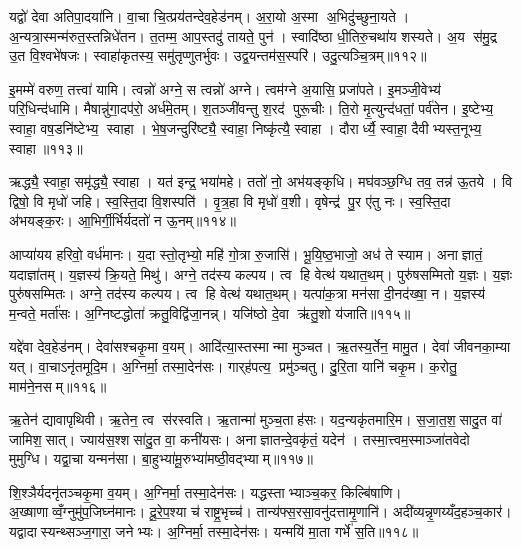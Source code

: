 यद्वो॑ देवा अतिपा॒दया॑नि। वा॒चा चि॒त्प्रय॑तन्देव॒हेड॑नम्। अ॒रा॒यो अ॒स्मा अ॒भिदु॑च्छुना॒यते। अ॒न्यत्रा॒स्मन्म॑रुत॒स्तन्निधे॑तन। त॒तम्म॒ आप॒स्तदु॑ तायते॒ पुन॑। स्वादि॑ष्ठा धी॒तिरु॒चथा॑य शस्यते। अ॒य स॑मु॒द्र उ॒त वि॒श्वभे॑षजः। स्वाहा॑कृतस्य॒ समु॑तृप्णुतर्भुवः। उद्व॒यन्तम॑स॒स्परि॑। उदु॒त्यञ्चि॒त्रम्॥११२॥

इ॒मम्मे॑ वरुण॒ तत्त्वा॑ यामि। त्वन्नो॑ अग्ने॒ स त्वन्नो॑ अग्ने। त्वम॑ग्ने अ॒यासि॒ प्रजा॑पते। इ॒मञ्जी॒वेभ्य॑ परि॒धिन्द॑धामि। मैषान्नु॑गा॒दप॑रो॒ अर्ध॑मे॒तम्। श॒तञ्जी॑वन्तु श॒रद॑ पुरू॒चीः। ति॒रो मृ॒त्युन्द॑धतां॒ पर्व॑तेन। इ॒ष्टेभ्य॒ स्वाहा॒ वष॒डनि॑ष्टेभ्य॒ स्वाहा। भे॒ष॒जन्दुरि॑ष्ट्यै॒ स्वाहा॒ निष्कृ॑त्यै॒ स्वाहा। दौरार्ध्यै॒ स्वाहा॒ दैवीभ्यस्त॒नूभ्य॒ स्वाहा॥११३॥

ऋद्ध्यै॒ स्वाहा॒ समृ॑द्ध्यै॒ स्वाहा। यत॑ इन्द्र॒ भया॑महे। ततो॑ नो॒ अभ॑यङ्कृधि। मघ॑वञ्छ॒ग्धि तव॒ तन्न॑ ऊ॒तये। वि द्विषो॒ वि मृधो॑ जहि। स्व॒स्ति॒दा वि॒शस्पति॑। वृ॒त्र॒हा वि मृधो॑ व॒शी। वृषेन्द्र॑ पु॒र ए॑तु नः। स्व॒स्ति॒दा अ॑भयङ्क॒रः। आ॒भिर्गी॒र्भिर्यदतो॑ न ऊ॒नम्॥११४॥

आप्या॑यय हरिवो॒ वर्ध॑मानः। य॒दा स्तो॒तृभ्यो॒ महि॑ गो॒त्रा रु॒जासि॑। भू॒यि॒ष्ठ॒भाजो॒ अध॑ ते स्याम। अनाज्ञातं॒ यदाज्ञा॑तम्। य॒ज्ञस्य॑ क्रि॒यते॒ मिथु॑। अग्ने॒ तद॑स्य कल्पय। त्व हि वेत्थ॑ यथात॒थम्। पुरु॑षसम्मितो य॒ज्ञः। य॒ज्ञः पुरु॑षसम्मितः। अग्ने॒ तद॑स्य कल्पय। त्व हि वेत्थ॑ यथात॒थम्। यत्पा॑क॒त्रा मन॑सा दी॒नद॑ख्षा॒ न। य॒ज्ञस्य॑ म॒न्वते॒ मर्ता॑सः। अ॒ग्निष्टद्धोता॑ क्रतु॒विद्वि॑जा॒नन्न्। यजि॑ष्ठो दे॒वा ऋ॑तु॒शो य॑जाति॥११५॥\anuvakamend[दे॒वा श्चि॒त्रं त॒नूभ्य॒ स्वाहो॒नं पुरु॑षसम्मि॒तोऽग्ने॒ तद॑स्य कल्पय॒ पञ्च॑ च]

यद्दे॑वा देव॒हेड॑नम्। देवा॑सश्चकृ॒मा व॒यम्। आदि॑त्या॒स्तस्मान्मा मुञ्चत। ऋ॒तस्य॒र्तेन॒ मामु॒त। देवा॑ जीवनका॒म्या यत्। वा॒चाऽनृ॑तमूदि॒म। अ॒ग्निर्मा॒ तस्मा॒देन॑सः। गार्‌ह॑पत्य॒ प्रमु॑ञ्चतु। दु॒रि॒ता यानि॑ चकृ॒म। क॒रोतु॒ माम॑ने॒नसम्॥११६॥

ऋ॒तेन॑ द्यावापृथिवी। ऋ॒तेन॒ त्व स॑रस्वति। ऋ॒तान्मा॑ मुञ्च॒ताह॑सः। यद॒न्यकृ॑तमारि॒म। स॒जा॒त॒श॒सादु॒त वा॑ जामिश॒सात्। ज्याय॑स॒श्शसा॑दु॒त वा॒ कनी॑यसः। अनाज्ञातन्दे॒वकृ॑तं॒ यदेन॑। तस्मा॒त्त्वम॒स्माञ्जा॑तवेदो मुमुग्धि। यद्वा॒चा यन्मन॑सा। बा॒हुभ्या॑मू॒रुभ्या॑मष्ठी॒वद्भ्याम्॥११७॥

शि॒श्ञैर्यदनृ॑तञ्चकृ॒मा व॒यम्। अ॒ग्निर्मा॒ तस्मा॒देन॑सः। यद्धस्ताभ्याञ्च॒कर॒ किल्बि॑षाणि। अ॒ख्षाणाव्वँ॒ग्नुमु॑प॒जिघ्न॑मानः। दू॒रे॒प॒श्या च॑ राष्ट्र॒भृच्च॑। तान्य॑फ्स॒रसा॒वनु॑दत्तामृ॒णानि॑। अदी॑व्यन्नृ॒णय्यँद॒हञ्च॒कार॑। यद्वादास्यन्थ्सञ्ज॒गारा॒ जनेभ्यः। अ॒ग्निर्मा॒ तस्मा॒देन॑सः। यन्मयि॑ मा॒ता गर्भे॑ स॒ति॥११८॥

